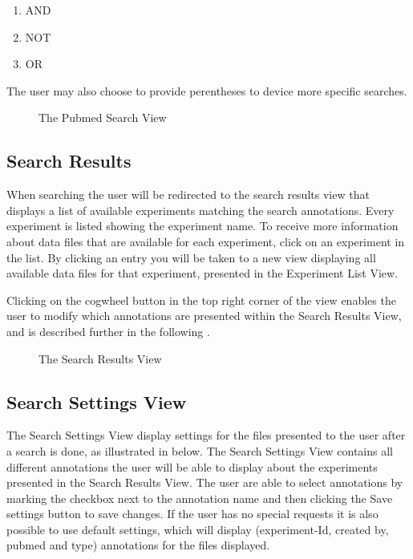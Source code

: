 \begin{enumerate}
\item AND
\item NOT
\item OR
\end{enumerate}

The user may also choose to provide perentheses to device more specific searches.

\begin{figure}[h]
\caption{The Pubmed Search View}
\label{fig:and_pubmed_man} 
\end{figure}
\FloatBarrier


\subsection{Search Results}
When searching the user will be redirected to the search results view  that displays a list of available experiments matching the search annotations. Every experiment is listed showing the experiment name. To receive more information about data files that are available for each experiment, click on an experiment in the list. By clicking an entry you will be taken to a new view displaying all available data files for that experiment, presented in the Experiment List View. 

Clicking on the cogwheel button in the top right corner of the view enables the user to modify which annotations are presented within the Search Results View, and is described further in the following .

\begin{figure}[h]
\caption{The Search Results View}
\label{fig:and_search_results_man} 
\end{figure}
\FloatBarrier


\subsection{Search Settings View}\label{sec:search_settings}
The Search Settings View display settings for the files presented to the user after a search is done, as illustrated in   below. The Search Settings View contains all different annotations the user will be able to display about the experiments presented in the Search Results View. The user are able to select annotations by marking the checkbox next to the annotation name and then clicking the Save settings button to save changes. If the user has no special requests it is also possible to use default settings, which will display (experiment-Id, created by, pubmed and type) annotations for the files displayed. 




